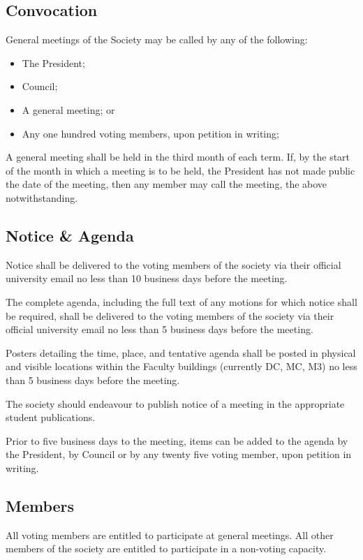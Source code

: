 \subsection{Convocation}
General meetings of the Society may be called by any of the following:
\begin{itemize}
  \item The President;
  \item Council;
  \item A general meeting; or
  \item Any one hundred voting members, upon petition in writing;
\end{itemize}

A general meeting shall be held in the third month of each term. If, by the
start of the month in which a meeting is to be held, the President has not
made public the date of the meeting, then any member may call the meeting, the
above notwithstanding.

\subsection{Notice \& Agenda}

Notice shall be delivered to the voting members of the society via their official university email no less than 10 business days before the meeting.

The complete agenda, including the full text of any motions for which notice shall be required, shall be delivered to the voting members of the society via their official university email no less than 5 business days before the meeting.

Posters detailing the time, place, and tentative agenda shall be posted in physical and visible locations within the Faculty buildings (currently DC, MC, M3) no less than 5 business days before the meeting.

The society should endeavour to publish notice of a meeting in the appropriate student publications.

Prior to five business days to the meeting, items can be added to the agenda by the President, by Council or by any twenty five voting member, upon petition in writing.

\subsection{Members}
All voting members are entitled to participate at general meetings. All other
members of the society are entitled to participate in a non-voting capacity.

